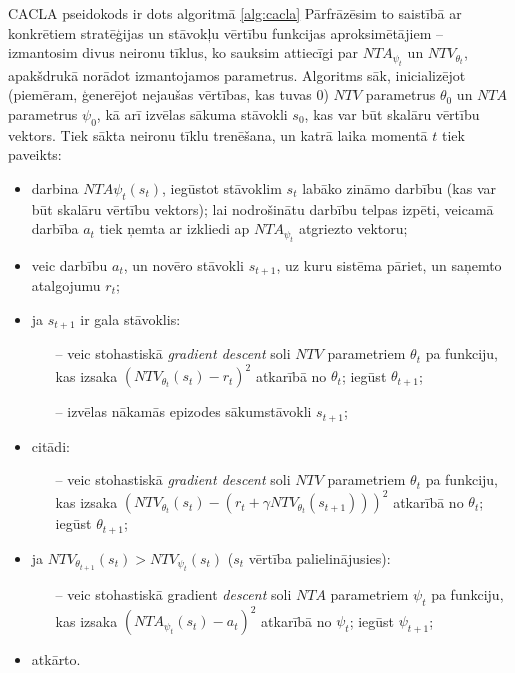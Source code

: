 \documentclass{ludis} %
\begin{document}
CACLA pseidokods ir dots algoritmā \ref{alg:cacla} Pārfrāzēsim to saistībā ar
konkrētiem stratēģijas un stāvokļu vērtību funkcijas aproksimētājiem --
izmantosim divus neironu tīklus, ko sauksim attiecīgi par $NTA_{\psi_t}$ un
$NTV_{\theta_t}$, apakšdrukā norādot izmantojamos parametrus. Algoritms sāk,
inicializējot (piemēram, ģenerējot nejaušas vērtības, kas tuvas $0$) $NTV$
parametrus $\theta_0$ un $NTA$ parametrus $\psi_0$, kā arī izvēlas sākuma
stāvokli $s_0$, kas var būt skalāru vērtību vektors. Tiek sākta neironu tīklu
trenēšana, un katrā laika momentā $t$ tiek paveikts:
\begin{itemize}
	\item darbina $NTA{\psi_t}(s_t)$, iegūstot stāvoklim $s_t$ labāko zināmo
    darbību (kas var būt skalāru vērtību vektors); lai nodrošinātu darbību
    telpas izpēti, veicamā darbība  $a_t$ tiek ņemta ar izkliedi ap
    $NTA_{\psi_t}$ atgriezto vektoru;
	\item veic darbību $a_t$, un novēro stāvokli $s_{t+1}$, uz kuru sistēma
    pāriet, un saņemto atalgojumu $r_t$;
	\item ja $s_{t+1}$ ir gala stāvoklis:
	\begin{itemize}
		\item[--] veic stohastiskā \textit{gradient descent} soli $NTV$ parametriem
      $\theta_t$ pa funkciju, kas izsaka $\left(NTV_{\theta_t}(s_t) -
        r_t\right)^2$ atkarībā no $\theta_t$; iegūst $\theta_{t+1}$;
		\item[--] izvēlas nākamās epizodes sākumstāvokli $s_{t+1}$;
	\end{itemize}
	\item citādi:
	\begin{itemize}
		\item[--] veic stohastiskā \textit{gradient descent} soli $NTV$ parametriem
      $\theta_t$ pa funkciju, kas izsaka ${\left(NTV_{\theta_t}(s_t) - \left(r_t
          + \gamma NTV_{\theta_t}(s_{t+1}) \right) \right)}^2$ atkarībā no
      $\theta_t$; iegūst $\theta_{t+1}$;
	\end{itemize}
	\item ja $NTV_{\theta_{t+1}}(s_t) > NTV_{\psi_t}(s_t)$ ($s_t$ vērtība
    palielinājusies):
	\begin{itemize}
		\item[--] veic stohastiskā gradient \textit{descent} soli $NTA$ parametriem
      $\psi_t$ pa funkciju, kas izsaka ${\left(NTA_{\psi_t}(s_t) - a_t\right)}^2$
      atkarībā no $\psi_t$; iegūst $\psi_{t+1}$;
	\end{itemize}
	\item atkārto.
\end{itemize}
\end{document}
